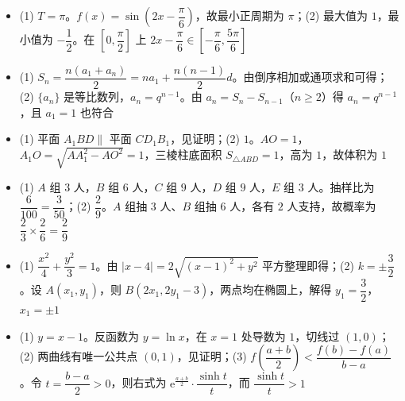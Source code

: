 \begin{itemize}[leftmargin=2.6em]
  \item[\textbf{18.}] (1) $T=\pi$。$f(x)=\sin\left(2x-\dfrac\pi6\right)$，故最小正周期为 $\pi$；(2) 最大值为 $1$，最小值为 $-\dfrac12$。在 $\left[0,\dfrac\pi2\right]$ 上 $2x-\dfrac\pi6\in\left[-\dfrac\pi6,\dfrac{5\pi}6\right]$
  \item[\textbf{19.}] (1) $S_n=\dfrac{n(a_1+a_n)}2=na_1+\dfrac{n(n-1)}2d$。由倒序相加或通项求和可得；(2) $\{a_n\}$ 是等比数列，$a_n=q^{n-1}$。由 $a_n=S_n-S_{n-1}$（$n\geqslant2$）得 $a_n=q^{n-1}$，且 $a_1=1$ 也符合
  \item[\textbf{20.}] (1) 平面 $A_1BD\parallel$ 平面 $CD_1B_1$，见证明；(2) $1$。$AO=1$，$A_1O=\sqrt{AA_1^2-AO^2}=1$，三棱柱底面积 $S_{\triangle ABD}=1$，高为 $1$，故体积为 $1$
  \item[\textbf{21.}] (1) $A$ 组 $3$ 人，$B$ 组 $6$ 人，$C$ 组 $9$ 人，$D$ 组 $9$ 人，$E$ 组 $3$ 人。抽样比为 $\dfrac6{100}=\dfrac3{50}$；(2) $\dfrac29$。$A$ 组抽 $3$ 人、$B$ 组抽 $6$ 人，各有 $2$ 人支持，故概率为 $\dfrac23\times\dfrac26=\dfrac29$
  \item[\textbf{22.}] (1) $\dfrac{x^2}4+\dfrac{y^2}3=1$。由 $|x-4|=2\sqrt{(x-1)^2+y^2}$ 平方整理即得；(2) $k=\pm\dfrac32$。设 $A(x_1,y_1)$，则 $B(2x_1,2y_1-3)$，两点均在椭圆上，解得 $y_1=\dfrac32$，$x_1=\pm1$
  \item[\textbf{23.}] (1) $y=x-1$。反函数为 $y=\ln x$，在 $x=1$ 处导数为 $1$，切线过 $(1,0)$；(2) 两曲线有唯一公共点 $(0,1)$，见证明；(3) $f\left(\dfrac{a+b}{2}\right)<\dfrac{f(b)-f(a)}{b-a}$。令 $t=\dfrac{b-a}2>0$，则右式为 $\mathrm e^{\frac{a+b}2}\cdot\dfrac{\sinh t}{t}$，而 $\dfrac{\sinh t}{t}>1$
\end{itemize}
